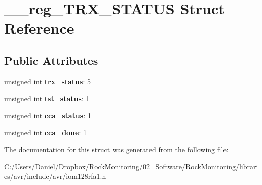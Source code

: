 \hypertarget{struct____reg___t_r_x___s_t_a_t_u_s}{}\section{\+\_\+\+\_\+reg\+\_\+\+T\+R\+X\+\_\+\+S\+T\+A\+T\+US Struct Reference}
\label{struct____reg___t_r_x___s_t_a_t_u_s}
\subsection*{Public Attributes}
\begin{DoxyCompactItemize}
\item 
unsigned int {\bfseries trx\+\_\+status}\+: 5\hypertarget{struct____reg___t_r_x___s_t_a_t_u_s_a0ad7d1b0f3d2fea33e2635623e9eba30}{}\label{struct____reg___t_r_x___s_t_a_t_u_s_a0ad7d1b0f3d2fea33e2635623e9eba30}

\item 
unsigned int {\bfseries tst\+\_\+status}\+: 1\hypertarget{struct____reg___t_r_x___s_t_a_t_u_s_a4c389f432faf1d33c5f4a574ca1387f0}{}\label{struct____reg___t_r_x___s_t_a_t_u_s_a4c389f432faf1d33c5f4a574ca1387f0}

\item 
unsigned int {\bfseries cca\+\_\+status}\+: 1\hypertarget{struct____reg___t_r_x___s_t_a_t_u_s_a5a0a8ce01cf5fd1f56b3f8e7df2fb1b2}{}\label{struct____reg___t_r_x___s_t_a_t_u_s_a5a0a8ce01cf5fd1f56b3f8e7df2fb1b2}

\item 
unsigned int {\bfseries cca\+\_\+done}\+: 1\hypertarget{struct____reg___t_r_x___s_t_a_t_u_s_a84804466135d4d6c04f006fa7ed1535d}{}\label{struct____reg___t_r_x___s_t_a_t_u_s_a84804466135d4d6c04f006fa7ed1535d}

\end{DoxyCompactItemize}


The documentation for this struct was generated from the following file\+:\begin{DoxyCompactItemize}
\item 
C\+:/\+Users/\+Daniel/\+Dropbox/\+Rock\+Monitoring/02\+\_\+\+Software/\+Rock\+Monitoring/libraries/avr/include/avr/iom128rfa1.\+h\end{DoxyCompactItemize}

